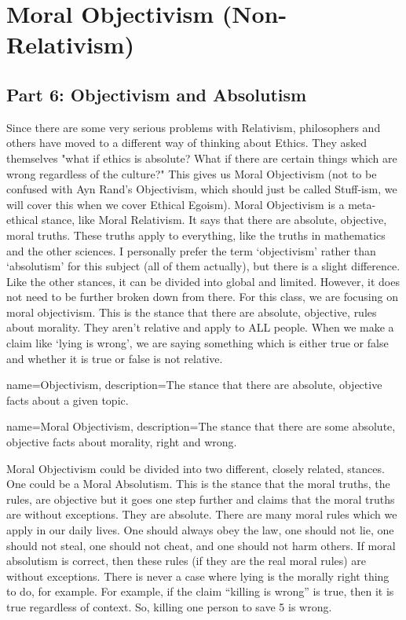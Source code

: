 \part{Moral Objectivism (Non-Relativism)}
\label{ch.mod2}
\chapter{Part 6: Objectivism and Absolutism}
Since there are some very serious problems with Relativism, philosophers and others have moved to a different way of thinking about Ethics. They asked themselves "what if ethics is absolute? What if there are certain things which are wrong regardless of the culture?" This gives us \gls{Moral Objectivism} (not to be confused with Ayn Rand's Objectivism, which should just be called Stuff-ism, we will cover this when we cover Ethical Egoism). Moral Objectivism is a meta-ethical stance, like Moral Relativism. It says that there are absolute, objective, moral truths. These truths apply to everything, like the truths in mathematics and the other sciences.  I personally prefer the term ‘objectivism’ rather than ‘absolutism’ for this subject (all of them actually), but there is a slight difference. Like the other stances, it can be divided into global and limited. However, it does not need to be further broken down from there. For this class, we are focusing on moral objectivism. This is the stance that there are absolute, objective, rules about morality. They aren’t relative and apply to ALL people. When we make a claim like ‘lying is wrong’, we are saying something which is either true or false and whether it is true or false is not relative.

{
  name=Objectivism,
  description={The stance that there are absolute, objective facts about a given topic.}
}

{
  name=Moral Objectivism,
  description={The stance that there are some absolute, objective facts about morality, right and wrong.}
}


Moral Objectivism could be divided into two different, closely related, stances. One could be a \gls{Moral Absolutism}. This is the stance that the moral truths, the rules, are objective but it goes one step further and claims that the moral truths are without exceptions. They are absolute. There are many moral rules which we apply in our daily lives. One should always obey the law, one should not lie, one should not steal, one should not cheat, and one should not harm others. If moral absolutism is correct, then these rules (if they are the real moral rules) are without exceptions. There is never a case where lying is the morally right thing to do, for example. For example, if the claim “killing is wrong” is true, then it is true regardless of context. So, killing one person to save 5 is wrong. 

